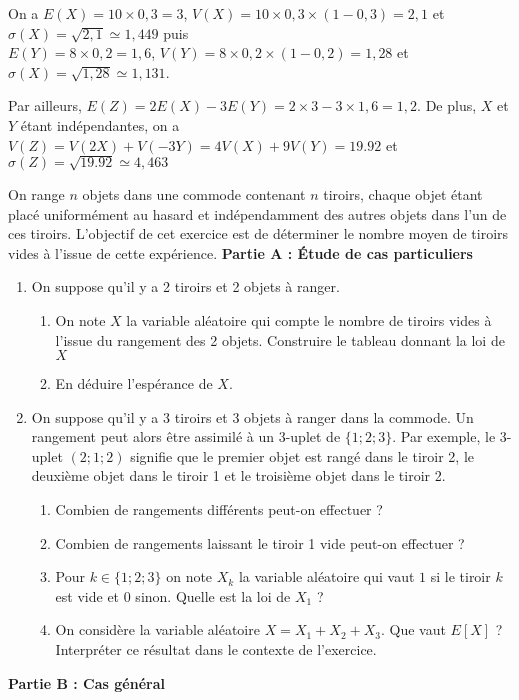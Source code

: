 \documentclass[11pt,fleqn, openany]{book} %
\begin{document}
\begin{solution}On a $E(X)= 10 \times 0,3=3$, $V(X)= 10 \times 0,3 \times (1-0,3)= 2,1$ et $\sigma(X)=\sqrt{2,1}\simeq 1,449$ puis \\ $E(Y)= 8 \times 0,2 = 1,6$, $V(Y)=8 \times 0,2 \times (1-0,2)= 1,28$ et $\sigma(X)=\sqrt{1,28} \simeq 1,131$.

Par ailleurs, $E(Z)=2E(X)-3E(Y)=2 \times 3 - 3 \times 1,6 = 1,2$. De plus, $X$ et $Y$ étant indépendantes, on a $V(Z)=V(2X)+V(-3Y)=4V(X)+9V(Y)=19.92$ et $\sigma(Z)=\sqrt{19.92}\simeq 4,463$
\end{solution}




\begin{exercise}[topic=lgn02]
On range $n$ objets dans une commode contenant $n$ tiroirs, chaque objet étant placé uniformément au hasard et indépendamment des autres objets dans l'un de ces tiroirs. L'objectif de cet exercice est de déterminer le nombre moyen de tiroirs vides à l'issue de cette expérience.
\vskip10pt
\textbf{Partie A : Étude de cas particuliers}

\begin{enumerate}
\item On suppose qu'il y a 2 tiroirs et 2 objets à ranger. 

\begin{enumerate}
\item On note $X$ la variable aléatoire qui compte le nombre de tiroirs vides à l'issue du rangement des 2 objets. Construire le tableau donnant la loi de $X$
\item En déduire l'espérance de $X$. 
\end{enumerate}
\item On suppose qu'il y a 3 tiroirs et 3 objets à ranger dans la commode. Un rangement peut alors être assimilé à un 3-uplet de $\{1;2;3\}$. Par exemple, le 3-uplet $(2;1;2)$ signifie que  le premier objet est rangé dans le tiroir 2, le deuxième objet dans le tiroir 1 et le troisième objet dans le tiroir 2.
\begin{enumerate}
\item Combien de rangements différents peut-on effectuer ?
\item Combien de rangements laissant le tiroir 1 vide peut-on effectuer ?
\item Pour $k \in \{ 1 ; 2 ; 3\}$ on note $X_k$ la variable aléatoire qui vaut $1$ si le tiroir $k$ est vide et 0 sinon. Quelle est la loi de $X_1$ ?
\item On considère la variable aléatoire $X=X_1+X_2+X_3$. Que vaut $E[X]$ ? Interpréter ce résultat dans le contexte de l'exercice.
\end{enumerate}
\end{enumerate}
\newpage
\textbf{Partie B : Cas général}


\end{exercise}
\end{document}
